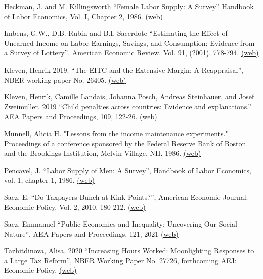 \documentclass[landscape]{slides}
\begin{document}
\begin{slide}
{Heckman, J. and M. Killingsworth ``Female Labor Supply: A Survey'' Handbook of Labor Economics, Vol. I, Chapter 2, 1986. \href{http://elsa.berkeley.edu/~saez/course/Heckman and Killingsworth_Handbook.pdf} {(web)}

Imbens, G.W., D.B. Rubin and B.I. Sacerdote ``Estimating the Effect of Unearned Income on Labor Earnings, Savings, and Consumption: Evidence from a Survey of Lottery'', American Economic Review, Vol. 91, (2001), 778-794. \href{http://links.jstor.org/stable/pdfplus/2677812.pdf} {(web)}

Kleven, Henrik 2019. ``The EITC and the Extensive Margin: A Reappraisal'', NBER working
paper No. 26405.
\href{http://www.nber.org/papers/w26405.pdf} {(web)} 

Kleven, Henrik, Camille Landais, Johanna Posch, Andreas Steinhauer, and Josef Zweimuller. 2019 ``Child penalties across countries: Evidence and explanations.'' AEA Papers and Proceedings, 109, 122-26. 
\href{https://pubs.aeaweb.org/doi/pdfplus/10.1257/pandp.20191078} {(web)}



Munnell, Alicia H. "Lessons from the income maintenance experiments." Proceedings of a conference sponsored by the Federal Reserve Bank of Boston and the Brookings Institution, Melvin Village, NH. 1986. \href{http://elsa.berkeley.edu/~saez/course/Munnell(1986)book.pdf} {(web)}

Pencavel, J. ``Labor Supply of Men: A Survey'', Handbook of Labor Economics, 	vol. 1, chapter 1, 1986. \href{http://elsa.berkeley.edu/~saez/course/Pencavel_Handbook.pdf} {(web)}

Saez, E. ``Do Taxpayers Bunch at Kink Points?'', American Economic Journal: Economic Policy, Vol. 2, 2010, 180-212. \href{http://elsa.berkeley.edu/~saez/course/Saez_AEJ(2010).pdf} {(web)}

Saez, Emmanuel  ``Public Economics and Inequality: Uncovering Our Social Nature'', AEA Papers and Proceedings, 121, 2021
\href{https://eml.berkeley.edu/~saez/saez-AEAlecture.pdf} {(web)} 

Tazhitdinova, Alisa. 2020 ``Increasing Hours Worked: Moonlighting Responses to a Large Tax Reform'',
NBER Working Paper No. 27726, forthcoming AEJ: Economic Policy. \href{http://www.nber.org/papers/w27726.pdf} {(web)}

}
\end{slide}
\end{document}
